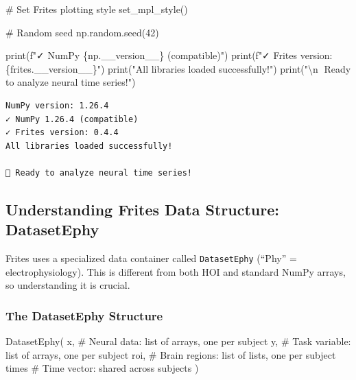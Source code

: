 \documentclass[
  11pt,
  letterpaper,
  oneside,
  openany]{book}
\newenvironment{Shaded}{\begin{snugshade}}{\end{snugshade}}
\newcommand{\BuiltInTok}[1]{\textcolor[rgb]{0.00,0.23,0.31}{#1}}
\newcommand{\CharTok}[1]{\textcolor[rgb]{0.13,0.47,0.30}{#1}}
\newcommand{\CommentTok}[1]{\textcolor[rgb]{0.37,0.37,0.37}{#1}}
\newcommand{\DecValTok}[1]{\textcolor[rgb]{0.68,0.00,0.00}{#1}}
\newcommand{\NormalTok}[1]{\textcolor[rgb]{0.00,0.23,0.31}{#1}}
\newcommand{\SpecialCharTok}[1]{\textcolor[rgb]{0.37,0.37,0.37}{#1}}
\newcommand{\SpecialStringTok}[1]{\textcolor[rgb]{0.13,0.47,0.30}{#1}}
\newcommand{\StringTok}[1]{\textcolor[rgb]{0.13,0.47,0.30}{#1}}
\begin{document}
\begin{Shaded}
\begin{Highlighting}[]
\CommentTok{\# Set Frites plotting style}
\NormalTok{set\_mpl\_style()}

\CommentTok{\# Random seed}
\NormalTok{np.random.seed(}\DecValTok{42}\NormalTok{)}

\BuiltInTok{print}\NormalTok{(}\SpecialStringTok{f"✓ NumPy }\SpecialCharTok{\{}\NormalTok{np}\SpecialCharTok{.}\NormalTok{\_\_version\_\_}\SpecialCharTok{\}}\SpecialStringTok{ (compatible)"}\NormalTok{)}
\BuiltInTok{print}\NormalTok{(}\SpecialStringTok{f"✓ Frites version: }\SpecialCharTok{\{}\NormalTok{frites}\SpecialCharTok{.}\NormalTok{\_\_version\_\_}\SpecialCharTok{\}}\SpecialStringTok{"}\NormalTok{)}
\BuiltInTok{print}\NormalTok{(}\StringTok{"All libraries loaded successfully!"}\NormalTok{)}
\BuiltInTok{print}\NormalTok{(}\StringTok{"}\CharTok{\textbackslash{}n}\StringTok{🎉 Ready to analyze neural time series!"}\NormalTok{)}
\end{Highlighting}
\end{Shaded}

\begin{verbatim}
NumPy version: 1.26.4
✓ NumPy 1.26.4 (compatible)
✓ Frites version: 0.4.4
All libraries loaded successfully!

🎉 Ready to analyze neural time series!
\end{verbatim}

\subsection{Understanding Frites Data Structure:
DatasetEphy}\label{understanding-frites-data-structure-datasetephy}

Frites uses a specialized data container called \texttt{DatasetEphy}
(``Phy'' = electrophysiology). This is different from both HOI and
standard NumPy arrays, so understanding it is crucial.

\subsubsection{The DatasetEphy
Structure}\label{the-datasetephy-structure}

\begin{Shaded}
\begin{Highlighting}[]
\NormalTok{DatasetEphy(}
\NormalTok{    x,        }\CommentTok{\# Neural data: list of arrays, one per subject}
\NormalTok{    y,        }\CommentTok{\# Task variable: list of arrays, one per subject  }
\NormalTok{    roi,      }\CommentTok{\# Brain regions: list of lists, one per subject}
\NormalTok{    times     }\CommentTok{\# Time vector: shared across subjects}
\NormalTok{)}
\end{Highlighting}
\end{Shaded}
\end{document}
